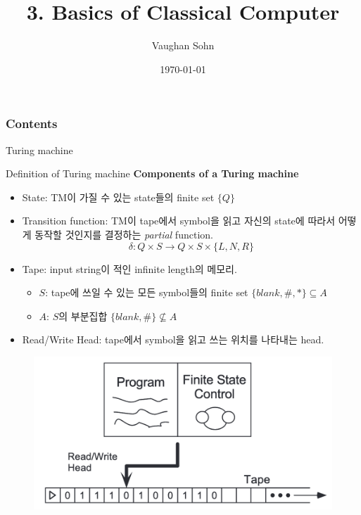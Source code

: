\documentclass[9pt]{beamer}
\title{3. Basics of Classical Computer}
\date{\today}
\author{Vaughan Sohn}
\begin{document}
    \maketitle
    
    \begin{frame}
        \frametitle{Contents}
        \tableofcontents
    \end{frame}


    \begin{section}{Turing machine}
        \begin{frame}{Definition of Turing machine}
            \textbf{Components of a Turing machine}
            \begin{itemize}
                \item State: TM이 가질 수 있는 state들의 finite set $\{Q\}$
                \item Transition function: TM이 tape에서 symbol을 읽고 자신의 state에 따라서 어떻게 동작할 것인지를 결정하는 \textit{partial} function.
                $$ \delta : Q \times S \rightarrow Q \times S \times \{L, N, R\}$$
                \item Tape: input string이 적인 infinite length의 메모리.
                \begin{itemize}
                    \item $S$: tape에 쓰일 수 있는 모든 symbol들의 finite set $\{blank, \#, \ast\} \subseteq A$
                    \item $A$: $S$의 부분집합 $\{blank, \#\} \nsubseteq A$
                \end{itemize}
                \item Read/Write Head: tape에서 symbol을 읽고 쓰는 위치를 나타내는 head.
            \end{itemize}
            \begin{figure}
                \includegraphics[width=0.5\columnwidth]{image/L3_turing_machine.png}
            \end{figure}
        \end{frame}


\end{section}
\end{document}
